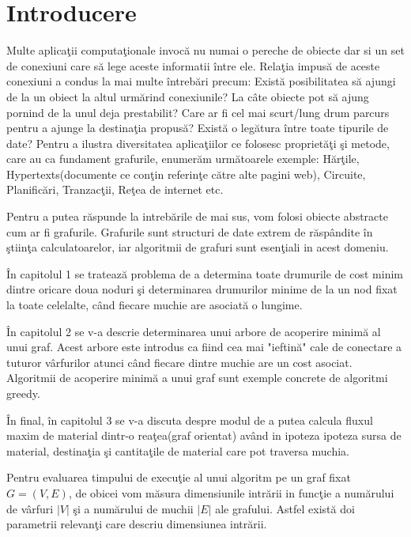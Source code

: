 \documentclass[11pt,a4paper]{report}
\begin{document}
	
	\tableofcontents
	\thispagestyle{empty}
	\fancyhf{}
	\clearpage
	
	\chapter*{Introducere}
	Multe aplica\c tii computa\c tionale invoc\u a nu numai o pereche de obiecte dar si un set de conexiuni care s\u a lege aceste informatii \^intre ele. Rela\c tia impus\u a de aceste conexiuni a condus la mai multe \^intreb\u ari precum: Exist\u a posibilitatea s\u a ajungi de la un obiect la altul urm\u arind conexiunile? La c\^ ate obiecte pot s\u a ajung pornind de la unul deja prestabilit? Care ar fi cel mai scurt/lung drum parcurs pentru a ajunge la destina\c tia propus\u a? Exist\u a o leg\u atura \^ intre toate tipurile de date? Pentru a ilustra diversitatea aplica\c tiilor ce folosesc propriet\u a\c ti \c si metode, care au ca fundament grafurile, enumer\u am urm\u atoarele exemple: H\u ar\c tile, Hypertexts(documente ce con\c tin referin\c te c\u atre alte pagini web), Circuite, Planific\u ari, Tranzac\c tii, Re\c tea de internet etc.
	
	Pentru a putea r\u aspunde la intreb\u arile de mai sus, vom folosi obiecte abstracte cum ar fi grafurile. Grafurile sunt structuri de date extrem de r\u asp\^ andite \^ in \c stiin\c ta calculatoarelor, iar algoritmii de grafuri sunt esen\c tiali in acest domeniu.
	
	\^ In  capitolul 1 se trateaz\u a problema de a determina toate drumurile de cost minim dintre oricare doua noduri \c si determinarea drumurilor minime de la un nod fixat la toate celelalte, c\^ and fiecare muchie are asociat\u a o lungime.
	
	\^ In capitolul 2 se v-a descrie determinarea unui arbore de acoperire minim\u a al unui graf. Acest arbore este introdus ca fiind  cea mai "ieftin\u a" cale de conectare a tuturor v\^ arfurilor atunci c\^ and fiecare dintre muchie are un cost asociat. Algoritmii de acoperire minim\u a a unui graf sunt exemple concrete de algoritmi greedy.
		
	\^ In final, \^ in capitolul 3 se v-a discuta despre modul de a putea calcula fluxul maxim de material dintr-o rea\c tea(graf orientat) av\^ and in ipoteza ipoteza sursa de material, destina\c tia \c si cantita\c tile de material care pot traversa muchia.
	
	Pentru evaluarea timpului de execu\c tie al unui algoritm pe un graf fixat $G=(V,E)$, de obicei vom m\u asura dimensiunile intr\u arii  in func\c tie a num\u arului de v\^ arfuri $|V|$ \c si a num\u arului de muchii $|E|$ ale grafului. Astfel exist\u a doi parametrii relevan\c ti care descriu dimensiunea intr\u arii.
\end{document}
